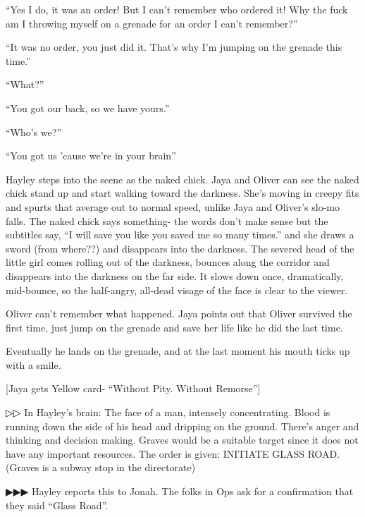 ``Yes I do, it was an order!  But I can't remember who ordered it!  Why the fuck am I throwing myself on a grenade for an order I can't remember?''

``It was no order, you just did it.  That's why I'm jumping on the grenade this time.''

``What?''

``You got our back, so we have yours.''

``Who's we?''

``You got us 'cause we're in your brain''



Hayley steps into the scene as the naked chick.  Jaya and Oliver can see the naked chick stand up and start walking toward the darkness.  She's moving in creepy fits and spurts that average out to normal speed, unlike Jaya and Oliver's slo-mo falls.  The naked chick says something- the words don't make sense but the subtitles say, ``I will save you like you saved me so many times.'' and she draws a sword (from where??) and disappears into the darkness.  The severed head of the little girl comes rolling out of the darkness, bounces along the corridor and disappears into the darkness on the far side. It slows down once, dramatically, mid-bounce, so the half-angry, all-dead visage of the face is clear to the viewer.



Oliver can't remember what happened.  Jaya points out that Oliver survived the first time, just jump on the grenade and save her life like he did the last time. 



Eventually he lands on the grenade, and at the last moment his mouth ticks up with a smile.  



{[}Jaya gets Yellow card- ``Without Pity. Without Remorse''{]}



▷▷ In Hayley's brain:  The face of a man, intensely concentrating.  Blood is running down the side of his head and dripping on the ground.  There's anger and thinking and decision making.  Graves would be a suitable target since it does not have any important resources.  The order is given: INITIATE GLASS ROAD. (Graves is a subway stop in the directorate) 



 {\color[RGB]{68,68,68}▶▶▶ } Hayley reports this to Jonah.  The folks in Ops ask for a confirmation that they said ``Glass Road''. 

